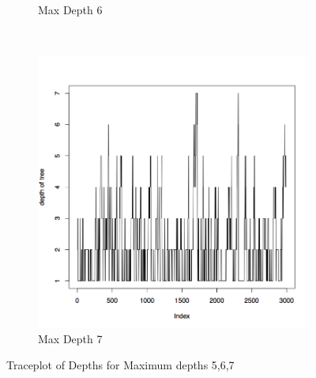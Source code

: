 \documentclass{article}
\begin{document}
\begin{figure}[H]
\begin{subfigure}[b]{0.3\textwidth}
                \caption{Max Depth 6}
                \label{fig:tiger}
        \end{subfigure}
        ~ %
        \begin{subfigure}[b]{0.3\textwidth}
                \centering
                \includegraphics[width=\textwidth]{depth_c7}
                \caption{Max Depth 7}
                \label{fig:mouse}
        \end{subfigure}
        \caption{Traceplot of Depths for Maximum depths 5,6,7}\label{fig:Boxplots567 }
\end{figure}
\end{document}

